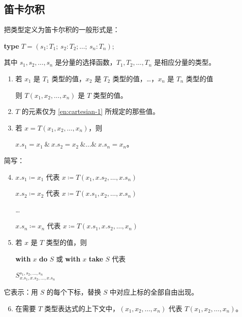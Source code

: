 \subsection{笛卡尔积}

把类型定义为笛卡尔积的一般形式是：

\quad \textbf{type} $T = (s_1 : T_1;\ s_2: T_2; \dots ;\ s_n: T_n);$

\noindent
其中 $s_1, s_2, \dots , s_n$ 是分量的选择函数，$T_1, T_2, \dots, T_n$ 是相应分量的类型。

\begin{enumerate}[leftmargin=2\parindent, label=(\arabic*)]
	\item \label{en:cartesian-1}
	若 $x_1$ 是 $T_1$ 类型的值，$x_2$ 是 $T_2$ 类型的值，\dots，$x_n$ 是 $T_n$ 类型的值

	\quad 则 $T(x_1, x_2, \dots, x_n)$ 是 $T$ 类型的值。

	\item $T$ 的元素仅为 \ref{en:cartesian-1} 所规定的那些值。

	\item 若 $x = T(x_1, x_2, \dots, x_n)$，则

	\quad $x.s_1 = x_1\ \&\ x.s_2 = x_2\ \& \dots \&\ x.s_n = x_n$。

\end{enumerate}

\noindent
简写：

\begin{enumerate}[leftmargin=2\parindent, label=(\arabic*)]
	\setcounter{enumi}{3}
	\item $x.s_1 \coloneq x_1$ 代表 $x\coloneq T(x_1, x.s_2, \dots, x.s_n)$

	$x.s_2 \coloneq x_2$ 代表 $x\coloneq T(x.s_1, x_2, \dots, x.s_n)$

	\qquad \dots

	$x.s_n \coloneq x_n$ 代表 $x\coloneq T(x.s_1, x.s_2, \dots, x_n)$

	\item 若 $x$ 是 $T$ 类型的值，则
	
	\textbf{with} $x$ \textbf{do} $S$ 或 \textbf{with} $x$ \textbf{take} $S$ 代表
	
	\quad $S_{x.s_1, x.s_2, \dots, x.s_n}^{s_1, s_2, \dots, s_n}$
\end{enumerate}

\noindent
它表示：用 $S$ 的每个下标，替换 $S$ 中对应上标的全部自由出现。

\begin{enumerate}[leftmargin=2\parindent, label=(\arabic*)]
	\setcounter{enumi}{5}
	\item 在需要 $T$ 类型表达式的上下文中，$(x_1, x_2, \dots, x_n)$ 代表 $T(x_1, x_2, \dots, x_n)$。
\end{enumerate}

